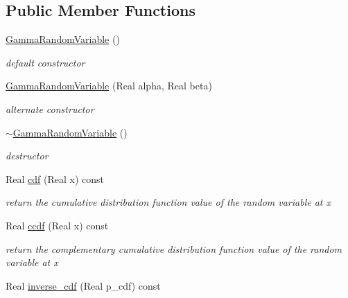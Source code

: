 \subsection*{Public Member Functions}
\begin{DoxyCompactItemize}
\item 
\hyperlink{classPecos_1_1GammaRandomVariable_ab20e31c6e009624c92e3e6dbc02101a9}{Gamma\+Random\+Variable} ()\label{classPecos_1_1GammaRandomVariable_ab20e31c6e009624c92e3e6dbc02101a9}

\begin{DoxyCompactList}\small\item\em default constructor \end{DoxyCompactList}\item 
\hyperlink{classPecos_1_1GammaRandomVariable_abfcee58f29493ea95cfface6997b8357}{Gamma\+Random\+Variable} (Real alpha, Real beta)\label{classPecos_1_1GammaRandomVariable_abfcee58f29493ea95cfface6997b8357}

\begin{DoxyCompactList}\small\item\em alternate constructor \end{DoxyCompactList}\item 
\hyperlink{classPecos_1_1GammaRandomVariable_a4b7e62bafb8df63c54960df9337933e7}{$\sim$\+Gamma\+Random\+Variable} ()\label{classPecos_1_1GammaRandomVariable_a4b7e62bafb8df63c54960df9337933e7}

\begin{DoxyCompactList}\small\item\em destructor \end{DoxyCompactList}\item 
Real \hyperlink{classPecos_1_1GammaRandomVariable_addd564e7f4f314e12d38df74d845f0d8}{cdf} (Real x) const \label{classPecos_1_1GammaRandomVariable_addd564e7f4f314e12d38df74d845f0d8}

\begin{DoxyCompactList}\small\item\em return the cumulative distribution function value of the random variable at x \end{DoxyCompactList}\item 
Real \hyperlink{classPecos_1_1GammaRandomVariable_a23c3b599e7e4788a9a5e9e93c3dbaf4d}{ccdf} (Real x) const \label{classPecos_1_1GammaRandomVariable_a23c3b599e7e4788a9a5e9e93c3dbaf4d}

\begin{DoxyCompactList}\small\item\em return the complementary cumulative distribution function value of the random variable at x \end{DoxyCompactList}\item 
Real \hyperlink{classPecos_1_1GammaRandomVariable_a918a1aac05ca349ea5313eebcba46c3e}{inverse\+\_\+cdf} (Real p\+\_\+cdf) const \label{classPecos_1_1GammaRandomVariable_a918a1aac05ca349ea5313eebcba46c3e}


\end{DoxyCompactItemize}
